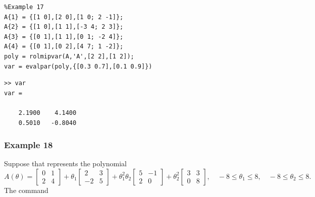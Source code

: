 \documentclass[english,11pt]{article}
\theoremstyle{break} \theorembodyfont{\small\rm}
\begin{document}
\begin{minipage}{10.5cm}
 \begin{lstlisting}
%Example 17
A{1} = {[1 0],[2 0],[1 0; 2 -1]};
A{2} = {[1 0],[1 1],[-3 4; 2 3]};
A{3} = {[0 1],[1 1],[0 1; -2 4]};
A{4} = {[0 1],[0 2],[4 7; 1 -2]};
poly = rolmipvar(A,'A',[2 2],[1 2]);
var = evalpar(poly,{[0.3 0.7],[0.1 0.9]})
 \end{lstlisting}
\end{minipage}
\vspace{0.2cm}

\begin{minipage}{7.5cm}
\begin{lstlisting}[rulecolor=\color{red}]
>> var
var =

    2.1900    4.1400
    0.5010   -0.8040
\end{lstlisting}
\end{minipage}
\vspace{0.2cm}


\subsubsection*{Example 18}

Suppose that  represents the polynomial
\[
 A(\theta) = \begin{bmatrix} 0 & 1 \\ 2 & 4 \end{bmatrix} +
 \theta_1 \begin{bmatrix} 2 & 3 \\ -2 & 5 \end{bmatrix} +
 \theta_1^2\theta_2 \begin{bmatrix} 5 & -1\\ 2 & 0 \end{bmatrix} +
 \theta_2^2 \begin{bmatrix} 3 & 3 \\ 0 & 8 \end{bmatrix}, \quad -8 \leq \theta_1 \leq 8, \quad -8 \leq \theta_2 \leq 8.
\]
The command

\vspace{0.5cm}%
\begin{minipage}{9.5cm}
\end{minipage}
\vspace{0.2cm}
\end{document}
